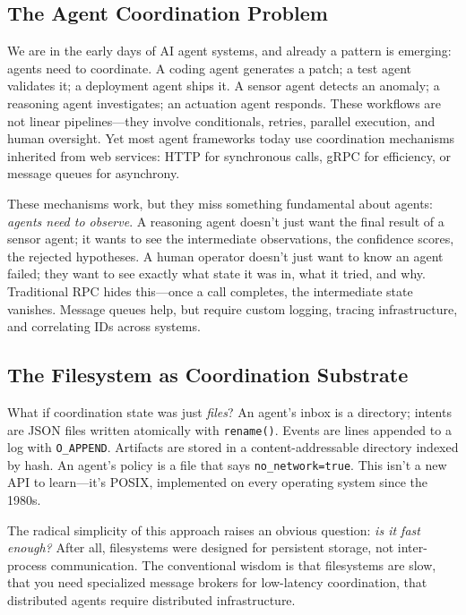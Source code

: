\documentclass[11pt]{article}
\begin{document}
\subsection{The Agent Coordination Problem}

We are in the early days of AI agent systems, and already a pattern is emerging: agents need to coordinate. A coding agent generates a patch; a test agent validates it; a deployment agent ships it. A sensor agent detects an anomaly; a reasoning agent investigates; an actuation agent responds. These workflows are not linear pipelines---they involve conditionals, retries, parallel execution, and human oversight. Yet most agent frameworks today use coordination mechanisms inherited from web services: HTTP for synchronous calls, gRPC for efficiency, or message queues for asynchrony.

These mechanisms work, but they miss something fundamental about agents: \emph{agents need to observe}. A reasoning agent doesn't just want the final result of a sensor agent; it wants to see the intermediate observations, the confidence scores, the rejected hypotheses. A human operator doesn't just want to know an agent failed; they want to see exactly what state it was in, what it tried, and why. Traditional RPC hides this---once a call completes, the intermediate state vanishes. Message queues help, but require custom logging, tracing infrastructure, and correlating IDs across systems.

\subsection{The Filesystem as Coordination Substrate}

What if coordination state was just \emph{files}? An agent's inbox is a directory; intents are JSON files written atomically with \texttt{rename()}. Events are lines appended to a log with \texttt{O\_APPEND}. Artifacts are stored in a content-addressable directory indexed by hash. An agent's policy is a file that says \texttt{no\_network=true}. This isn't a new API to learn---it's POSIX, implemented on every operating system since the 1980s.

The radical simplicity of this approach raises an obvious question: \emph{is it fast enough?} After all, filesystems were designed for persistent storage, not inter-process communication. The conventional wisdom is that filesystems are slow, that you need specialized message brokers for low-latency coordination, that distributed agents require distributed infrastructure.
\end{document}
